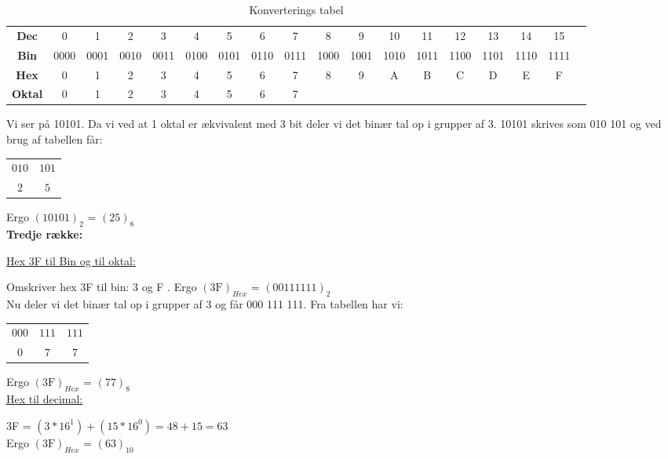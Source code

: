 \begin{table}[!htbp]
	\caption{Konverterings tabel}
	\setlength\tabcolsep{4pt}
	\begin{tabular}{|c|c|c|c|c|c|c|c|c|c|c|c|c|c|c|c|c|c|}
		\hline
		\textbf{Dec}&0&1&2&3&4&5&6&7&8&9&10&11&12&13&14&15\\ \cline{1-17}
		\textbf{Bin}&0000&0001&0010&0011&0100&0101&0110&0111&1000&1001&1010&1011&1100&1101&1110&1111\\ \cline{1-17}
		\textbf{Hex}&0&1&2&3&4&5&6&7&8&9&A&B&C&D&E&F\\ \cline{1-17}
		\textbf{Oktal}&0&1&2&3&4&5&6&7\\ \cline{1-9}
	\end{tabular}
\end{table}

Vi ser på 10101. Da vi ved at 1 oktal er ækvivalent med 3 bit deler vi det binær tal op i grupper af 3. 10101 skrives som 010 101 og ved brug af tabellen får:

\begin{table}[!htbp]
	\centering
	\begin{tabular}{cc}
		$010$&$101$\\ 
		$2$&$5$\\ 
	\end{tabular}
\end{table}

Ergo $(10101)_{2}$ = $(25)_{8}$\\

\textbf{Tredje række:}

\underline{Hex 3F til Bin og til oktal:}

Omskriver hex 3F til bin: 3  og F . Ergo $(3\text{F})_{Hex}$ = $(0011 1111)_{2}$\\

Nu deler vi det binær tal op i grupper af 3 og får 000 111 111. Fra tabellen har vi:

\begin{table}[!htbp]
	\centering
	\begin{tabular}{ccc}
		$000$&$111$&$111$\\ 
		$0$&$7$&$7$\\ 
	\end{tabular}
\end{table}

Ergo $(3\text{F})_{Hex}$ = $(77)_{8}$\\

\underline{Hex til decimal:}

3F = $(3*16^1)+(15*16^0) = 48 + 15 = 63$ \\
Ergo $(3\text{F})_{Hex}$ = $(63)_{10}$\\

